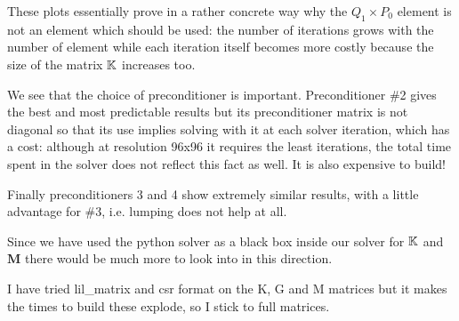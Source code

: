 These plots essentially prove in a rather concrete way why the $Q_1\times P_0$ element 
is not an element which should be used: the number of iterations grows with the 
number of element while each iteration itself becomes more costly because the size of the 
matrix ${\mathbb{K}}$ increases too.

We see that the choice of preconditioner is important. Preconditioner \#2 gives the best 
and most predictable results but its preconditioner matrix is not diagonal so that 
its use implies solving with it at each solver iteration, which has a cost: although at 
resolution 96x96 it requires the least iterations, the total time spent in the solver does
not reflect this fact as well. It is also expensive to build! 

Finally preconditioners 3 and 4 show extremely similar results, with a little 
advantage for \#3, i.e. lumping does not help at all.

Since we have used the python solver as a black box inside our solver for ${\mathbb{K}}$ and ${\bm M}$
there would be much more to look into in this direction.

\begin{remark}
I have tried lil\_matrix and csr format on the K, G and M matrices 
but it makes the times to build these explode, so I stick to full matrices. 
\end{remark}




